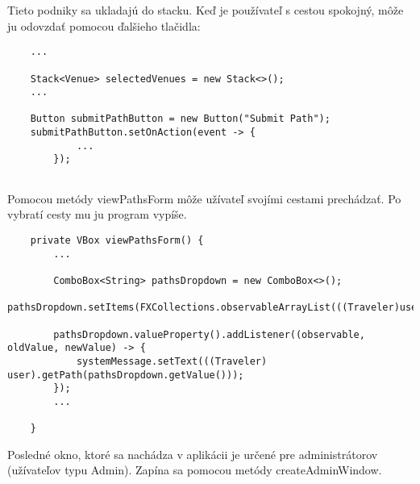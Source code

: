 \documentclass{article}
\begin{document}
Tieto podniky sa ukladajú do stacku. Keď je používateľ s cestou spokojný, môže ju odovzdať pomocou ďalšieho tlačidla:
\begin{verbatim}
    ...
    
    Stack<Venue> selectedVenues = new Stack<>();
    ...

    Button submitPathButton = new Button("Submit Path");
    submitPathButton.setOnAction(event -> {
            ...
        });
    
\end{verbatim}

Pomocou metódy viewPathsForm môže užívateľ svojími cestami prechádzať. Po vybratí cesty mu ju program vypíše.

\begin{verbatim}
    private VBox viewPathsForm() {
        ... 
        
        ComboBox<String> pathsDropdown = new ComboBox<>();
        pathsDropdown.setItems(FXCollections.observableArrayList(((Traveler)user).getPathNames()));

        pathsDropdown.valueProperty().addListener((observable, oldValue, newValue) -> {
            systemMessage.setText(((Traveler) user).getPath(pathsDropdown.getValue()));
        });
        ...
    
    }
\end{verbatim}

Posledné okno, ktoré sa nachádza v aplikácii je určené pre administrátorov (užívateľov typu Admin).
Zapína sa pomocou metódy createAdminWindow.
\end{document}
